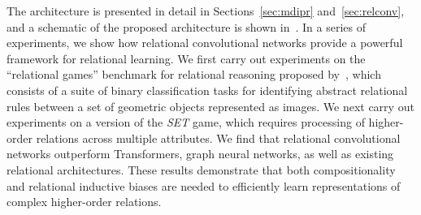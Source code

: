 The architecture is presented in detail in Sections~\ref{sec:mdipr} and~\ref{sec:relconv}, and a schematic of the proposed architecture is shown in~. In a series of experiments, we show how relational convolutional networks provide a powerful framework
for relational learning. We first carry out experiments on the ``relational games'' benchmark for relational reasoning proposed by~\citet{shanahanExplicitlyRelationalNeural}, which consists of a suite of binary classification tasks for identifying abstract relational rules between a set of geometric objects represented as images. 
We next carry out experiments on a version of the \textit{SET} game, which requires processing of higher-order relations across multiple attributes. We find that relational convolutional networks outperform Transformers, graph neural networks, as well as existing relational architectures. These results demonstrate that both compositionality and relational inductive biases are needed to efficiently learn representations of complex higher-order relations.


